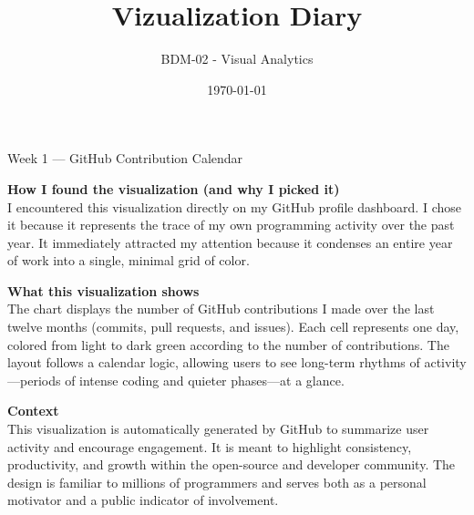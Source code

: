 \documentclass[aspectratio=169]{beamer}
\title{Vizualization Diary}
\subtitle{BDM-02 - Visual Analytics}
\author[Samuel Chapuis]{\and S.~Chapuis}
\date{\today}
\begin{document}
\frame{\titlepage}

\begin{frame}{Week 1 — GitHub Contribution Calendar}
\small
\noindent
\begin{minipage}{0.4\textwidth}
  \centering
  \hspace{20pt}
  \vrule width 0.5pt%
\end{minipage}
\begin{minipage}{0.5\textwidth}
  \centering
  \setlength{\parskip}{3mm}%
  \justifying
  \vspace{0pt} %
  
  \textbf{How I found the visualization (and why I picked it)}\\
  I encountered this visualization directly on my GitHub profile dashboard. I chose it because it represents the trace of my own programming activity over the past year. It immediately attracted my attention because it condenses an entire year of work into a single, minimal grid of color.

  \vfill %
  
  \textbf{What this visualization shows}\\
  The chart displays the number of GitHub contributions I made over the last twelve months (commits, pull requests, and issues). Each cell represents one day, colored from light to dark green according to the number of contributions. The layout follows a calendar logic, allowing users to see long-term rhythms of activity—periods of intense coding and quieter phases—at a glance.

  \vfill %
  
  \textbf{Context}\\
  This visualization is automatically generated by GitHub to summarize user activity and encourage engagement. It is meant to highlight consistency, productivity, and growth within the open-source and developer community. The design is familiar to millions of programmers and serves both as a personal motivator and a public indicator of involvement.


\end{minipage}
\end{frame}
\end{document}

